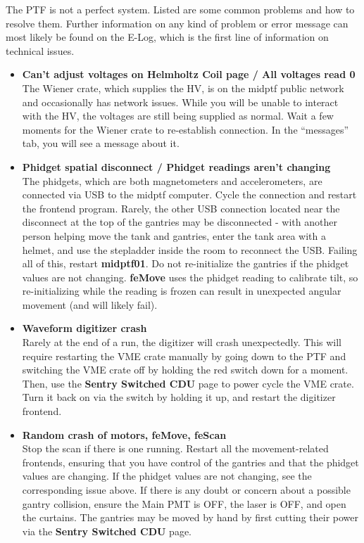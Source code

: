 \documentclass[twoside,letterpaper]{refart}
\begin{document}
The PTF is not a perfect system. Listed are some common problems and how to resolve them. Further information on any kind of problem or error message can most likely be found on the E-Log, which is the first line of information on technical issues.

\begin{itemize}

	\item \textbf{Can't adjust voltages on Helmholtz Coil page / All voltages read 0} \\
	The Wiener crate, which supplies the HV, is on the midptf public network and occasionally has network issues. While you will be unable to interact with the HV, the voltages are still being supplied as normal. Wait a few moments for the Wiener crate to re-establish connection. In the ``messages'' tab, you will see a message about it.

	\item \textbf{Phidget spatial disconnect / Phidget readings aren't changing} \\
	The phidgets, which are both magnetometers and accelerometers, are connected via USB to the midptf computer. Cycle the connection and restart the frontend program. Rarely, the other USB connection located near the disconnect at the top of the gantries may be disconnected - with another person helping move the tank and gantries, enter the tank area with a helmet, and use the stepladder inside the room to reconnect the USB. Failing all of this, restart \textbf{midptf01}. Do not re-initialize the gantries if the phidget values are not changing. \textbf{feMove} uses the phidget reading to calibrate tilt, so re-initializing while the reading is frozen can result in unexpected angular movement (and will likely fail).

	\item \textbf{Waveform digitizer crash} \\
	Rarely at the end of a run, the digitizer will crash unexpectedly. This will require restarting the VME crate manually by going down to the PTF and switching the VME crate off by holding the red switch down for a moment. Then, use the \textbf{Sentry Switched CDU} page to power cycle the VME crate. Turn it back on via the switch by holding it up, and restart the digitizer frontend.

	\item \textbf{Random crash of motors, feMove, feScan} \\
	Stop the scan if there is one running. Restart all the movement-related frontends, ensuring that you have control of the gantries and that the phidget values are changing. If the phidget values are not changing, see the corresponding issue above. If there is any doubt or concern about a possible gantry collision, ensure the Main PMT is OFF, the laser is OFF, and open the curtains. The gantries may be moved by hand by first cutting their power via the \textbf{Sentry Switched CDU} page.


\end{itemize}
\end{document}
